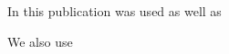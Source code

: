 \documentclass[../main.tex]{subfiles}
\begin{document}
\printbibliography[
heading=bibintoc, title=Literatur- und Quellenverzeichnis]

In this publication \cite{helisch_security_2009} was used as well as \cite{wisler_informationssicherheit_2013}

We also use \cite{bsi_bsi-standard_2008}
\end{document}
